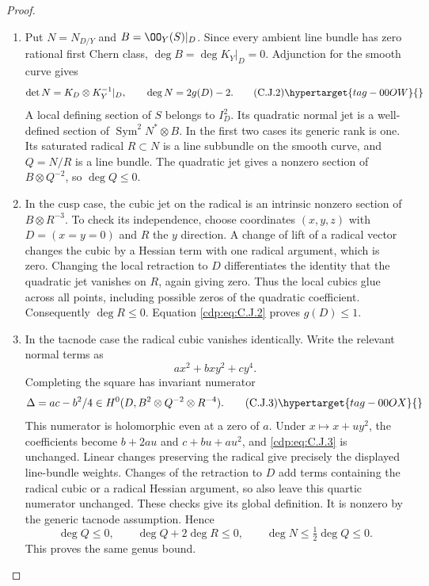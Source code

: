 \begin{proof}

\begin{enumerate}[label={$\langle1\rangle$\arabic*.},leftmargin=*]
\item Put $N=N_{D/Y}$ and $B=\OO_Y(S)|_D$. Since every ambient line bundle has zero rational first Chern class, $\deg B=\deg K_Y|_D=0$. Adjunction for the smooth curve gives
\[
 \det N=K_D\otimes K_Y^{-1}|_D,\qquad
 \deg N=2g(D)-2.                                      \tag{C.J.2}\hypertarget{tag-00OW}{}\label{cdp:eq:C.J.2}
\]
A local defining section of $S$ belongs to $I_D^2$. Its quadratic normal jet is a well-defined section of $\operatorname{Sym}^2N^*\otimes B$. In the first two cases its generic rank is one. Its saturated radical $R\subset N$ is a line subbundle on the smooth curve, and $Q=N/R$ is a line bundle. The quadratic jet gives a nonzero section of $B\otimes Q^{-2}$, so
$\deg Q\le0$.

\item In the cusp case, the cubic jet on the radical is an intrinsic nonzero section of $B\otimes R^{-3}$. To check its independence, choose coordinates $(x,y,z)$ with $D=(x=y=0)$ and $R$ the $y$ direction. A change of lift of a radical vector changes the cubic by a Hessian term with one radical argument, which is zero. Changing the local retraction to $D$ differentiates the identity that the quadratic jet vanishes on $R$, again giving zero. Thus the local cubics glue across all points, including possible zeros of the quadratic coefficient. Consequently $\deg R\le0$. Equation \eqref{cdp:eq:C.J.2} proves $g(D)\le1$.

\item In the tacnode case the radical cubic vanishes identically. Write the relevant normal terms as
\[
 a x^2+bxy^2+cy^4.
\]
Completing the square has invariant numerator
\[
 \Delta=ac-b^2/4\in
 H^0(D,B^2\otimes Q^{-2}\otimes R^{-4}).               \tag{C.J.3}\hypertarget{tag-00OX}{}\label{cdp:eq:C.J.3}
\]
This numerator is holomorphic even at a zero of $a$. Under $x\mapsto x+uy^2$, the coefficients become $b+2au$ and $c+bu+au^2$, and \eqref{cdp:eq:C.J.3} is unchanged. Linear changes preserving the radical give precisely the displayed line-bundle weights. Changes of the retraction to $D$ add terms containing the radical cubic or a radical Hessian argument, so also leave this quartic numerator unchanged. These checks give its global definition. It is nonzero by the generic tacnode assumption. Hence
\[
 \deg Q\le0,\qquad \deg Q+2\deg R\le0,
 \qquad \deg N\le\tfrac12\deg Q\le0.
\]
This proves the same genus bound.


\end{enumerate}
\end{proof}
